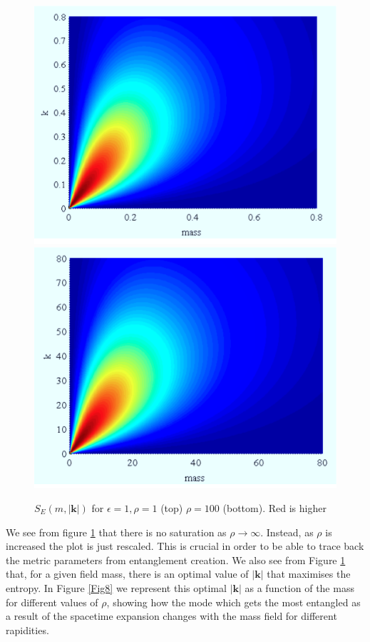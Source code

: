 \begin{figure}[H]
\begin{center}
\includegraphics[width=.75\textwidth]{massk1}
\includegraphics[width=.75\textwidth]{mkrho100}
\end{center}
\caption{ $S_E(m,|\bm k|)\!$ for $\!\epsilon=1,\! \rho=1\!$ (top) $\!\rho=100\!$ (bottom). Red is higher}
\label{fig3d2}
\end{figure}

We see from figure \ref{fig3d2} that there is no saturation as $\rho\rightarrow\infty$. Instead, as $\rho$ is increased the plot is just rescaled. This is crucial in order to be able to trace back the metric parameters from  entanglement creation.  
We also see from Figure \ref{fig3d2}  that, for a given  field mass, there is an optimal value of $|\bm k|$ that maximises the entropy. In Figure \ref{Fig8} we represent this optimal $|\bm k|$ as a function of the mass for different values of $\rho$, showing how the mode which gets the most entangled as a result of the spacetime expansion changes with the mass field for different rapidities.

